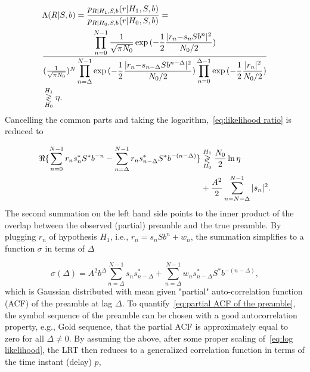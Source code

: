 \begin{equation}
    \label{eq:likelihood ratio}
    \begin{aligned}
    &\Lambda(R|S,b)=\frac{p_{R|H_1,S,b}(r|H_1,S,b)}{p_{R|H_0,S,b}(r|H_0,S,b)}= \\
    &\frac{\displaystyle \prod_{n=0}^{N-1}\frac{1}{\sqrt{\pi N_0}}\exp{(-\frac{1}{2}\frac{|r_{n}{-}s_nSb^n|^2}{N_0/2})}}
    {(\frac{1}{\sqrt{\pi N_0}})^N\displaystyle \prod_{n=\Delta}^{N-1}\exp{(-\frac{1}{2}\frac{|r_{n}{-}s_{n-\Delta}Sb^{n-\Delta}|^2}{N_0/2})} 
    \displaystyle \prod_{n=0}^{\Delta-1}\exp{(-\frac{1}{2}\frac{|r_n|^2}{N_0/2})}} \\
    &\mathrel{\mathop\gtrless\limits^{H_1}_{H_0}} \eta.
    \end{aligned}
\end{equation}
Cancelling the common parts and taking the logarithm,~\eqref{eq:likelihood ratio} is reduced to

\begin{equation}
    \label{eq:log likelihood}
    \begin{aligned}
    \Re\{\sum_{n=0}^{N-1}r_{n}s^*_nS^*b^{-n}-
    \sum_{n=\Delta}^{N-1}r_{n}s^*_{n-\Delta}S^*b^{-(n-\Delta)}\}
    &\mathrel{\mathop\gtrless\limits^{H_1}_{H_0}} \frac{N_0}{2}\ln\eta \\
    &+\frac{A^2}{2}\sum_{n=N-\Delta}^{N-1}|s_n|^2.
    \end{aligned}
\end{equation}
The second summation on the left hand side points to the inner product of the overlap between
the observed (partial) preamble and the true preamble. 
By plugging $r_{n}$ of hypothesis $H_1$, i.e., $r_{n}=s_nSb^n+w_n$, the summation simplifies 
to a function $\sigma$ in terms of $\Delta$

\begin{equation}
    \label{eq:partial ACF of the preamble}
    \sigma(\Delta)=A^2b^{\Delta}\sum_{n=\Delta}^{N-1}s_ns^*_{n-\Delta}+\sum_{n=\Delta}^{N-1}w_ns^*_{n-\Delta}S^*b^{-(n-\Delta)},
\end{equation}
which is Gaussian distributed with mean given  "partial" auto-correlation function (ACF) of the preamble at lag $\Delta$.
To quantify~\eqref{eq:partial ACF of the preamble}, the symbol sequence of the preamble can be chosen with a good autocorrelation property,
e.g., Gold sequence, that the partial ACF is approximately equal to zero for all $\Delta \neq 0$. 
By assuming the above, after some proper scaling of~\eqref{eq:log likelihood}, the LRT 
then reduces to a generalized correlation function in terms of the time instant (delay) $p$,

